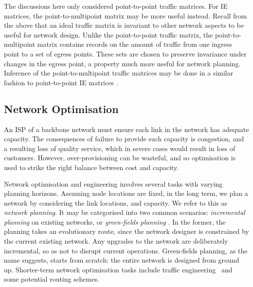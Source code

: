 The discussions here only considered point-to-point traffic
matrices. For IE matrices, the point-to-multipoint matrix may be more
useful instead. Recall from the above that an ideal traffic matrix is
invariant to other network aspects to be useful for network
design. Unlike the point-to-point traffic matrix, the
point-to-multipoint matrix contains records on the amount of traffic
from one ingress point to a set of egress points. These sets are
chosen to preserve invariance under changes in the egress point, a
property much more useful for network planning. Inference of the
point-to-multipoint traffic matrices may be done in a similar fashion
to point-to-point IE matrices \cite{Zhang03InfoSIGCOMM}.

\subsection{Network Optimisation}

An ISP of a backbone network must ensure
each link in the network has adequate capacity. The consequences of
failure to provide  such capacity is congestion, and a resulting loss
of quality service, which in severe cases would result in loss of
customers. However, over-provisioning can be wasteful, and so
optimisation is used to strike the right balance between cost and
capacity.

Network optimisation and engineering 
\cite{Mitra05StochasticTE,Buriol03GAOSPF,Murphy02TE,Fortz02OSPF,Fortz03OSPF,Nucci07IGP,Uhlig04Implications,Feamster03BGPTE,Rexford06Route} involves several tasks with varying planning
horizons. Assuming node locations are fixed, in the long term, we plan
a network by considering the link locations, and capacity. We refer to
this as {\em network planning}. It may be categorised into two common
scenarios: \emph{incremental planning} on existing networks, or
\emph{green-fields planning} \cite{Roughan10Robust}. In the former,
the planning takes an evolutionary route, since the network designer
is constrained by the current existing network. Any upgrades to the
network are deliberately incremental, so as not to disrupt current
operations. Green-fields planning, as the name suggests, starts from
scratch: the entire network is designed from ground up. Shorter-term
network optimisation tasks include traffic
engineering~\cite{Roughan03TETM} and some potential routing schemes.

